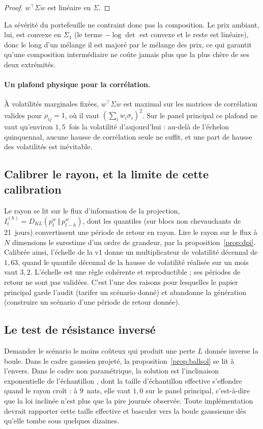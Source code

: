 \documentclass[11pt]{article}
\theoremstyle{definition}
\theoremstyle{remark}
\newcommand{\KL}[2]{D_{KL}\!\left(#1\,\Vert\,#2\right)}
\begin{document}
\begin{proof}
$w^\top\Sigma w$ est linéaire en $\Sigma$.
\end{proof}

La sévérité du portefeuille ne contraint donc pas la composition. Le prix
ambiant, lui, est convexe en $\Sigma_1$ (le terme $-\log\det$ est convexe et le
reste est linéaire), donc le long d'un mélange il est majoré par le mélange des
prix, ce qui garantit qu'une composition intermédiaire ne coûte jamais plus que
la plus chère de ses deux extrémités.

\paragraph{Un plafond physique pour la corrélation.} À volatilités marginales
fixées, $w^\top\Sigma w$ est maximal sur les matrices de corrélation valides pour
$\rho_{ij}=1$, où il vaut $(\sum_iw_i\sigma_i)^2$. Sur le panel principal ce
plafond ne vaut qu'environ $1{,}5$~fois la volatilité d'aujourd'hui : au-delà de
l'échelon quinquennal, aucune hausse de corrélation seule ne suffit, et une part
de hausse des volatilités est inévitable.

\subsection{Calibrer le rayon, et la limite de cette calibration}

Le rayon se lit sur le flux d'information de la projection,
$I^{(h)}_t=\KL{p^w_t}{p^w_{t-h}}$, dont les quantiles (sur blocs non
chevauchants de 21~jours) convertissent une période de retour en rayon. Lire le
rayon sur le flux à $N$ dimensions le surestime d'un ordre de grandeur, par la
proposition~\ref{prop:dpi}. Calibrée ainsi, l'échelle de la v1 donne un
multiplicateur de volatilité décennal de $1{,}63$, quand le quantile décennal de
la hausse de volatilité réalisée sur un mois vaut $3{,}2$. L'échelle est une
règle cohérente et reproductible ; ses périodes de retour ne sont pas validées.
C'est l'une des raisons pour lesquelles le papier principal garde l'audit
(tarifer un scénario donné) et abandonne la génération (construire un scénario
d'une période de retour donnée).

\subsection{Le test de résistance inversé}

Demander le scénario le moins coûteux qui produit une perte $L$ donnée inverse
la boule. Dans le cadre gaussien projeté, la
proposition~\ref{prop:ballsol} se lit à l'envers. Dans le cadre non
paramétrique, la solution est l'inclinaison exponentielle de l'échantillon
\citep{csiszar1975}, dont la taille d'échantillon effective s'effondre quand le
rayon croît : à $9$~nats, elle vaut $1{,}0$ sur le panel principal, c'est-à-dire
que la loi inclinée n'est plus que la pire journée observée. Toute
implémentation devrait rapporter cette taille effective et basculer vers la
boule gaussienne dès qu'elle tombe sous quelques dizaines.
\end{document}

